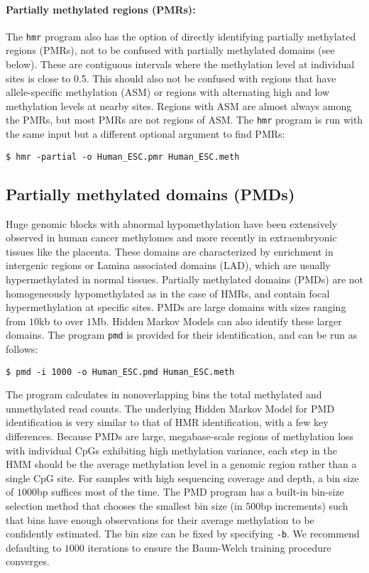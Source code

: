 \documentclass[10pt]{article}
\newcommand{\prog}[1]{\texttt{#1}}
\newcommand{\op}[1]{\texttt{#1}}
\begin{document}
\paragraph{Partially methylated regions (PMRs):}
The \prog{hmr} program also has the option of directly identifying
partially methylated regions (PMRs), not to be confused with partially
methylated domains (see below). These are contiguous intervals where
the methylation level at individual sites is close to 0.5. This should
also not be confused with regions that have allele-specific
methylation (ASM) or regions with alternating high and low methylation
levels at nearby sites. Regions with ASM are almost always among the
PMRs, but most PMRs are not regions of ASM. The \prog{hmr} program is
run with the same input but a different optional argument to find
PMRs:
\begin{verbatim}
$ hmr -partial -o Human_ESC.pmr Human_ESC.meth
\end{verbatim}


\subsection{Partially methylated domains (PMDs)}

Huge genomic blocks with abnormal hypomethylation have been
extensively observed in human cancer methylomes and more recently in
extraembryonic tissues like the placenta. These domains are
characterized by enrichment in intergenic regions or Lamina associated
domains (LAD), which are usually hypermethylated in normal
tissues. Partially methylated domains (PMDs) are not homogeneously
hypomethylated as in the case of HMRs, and contain focal
hypermethylation at specific sites. PMDs are large domains with sizes
ranging from $10$kb to over $1$Mb.  Hidden Markov Models can also
identify these larger domains. The program \prog{pmd} is provided for
their identification, and can be run as follows:

\begin{verbatim}
$ pmd -i 1000 -o Human_ESC.pmd Human_ESC.meth
\end{verbatim}

The program calculates in nonoverlapping bins the total methylated and
unmethylated read counts.
The underlying Hidden Markov Model for PMD identification is very
similar to that of HMR identification, with a few key differences. Because
PMDs are large, megabase-scale regions of methylation loss with
individual CpGs exhibiting high methylation variance, each step in
the HMM should be the average methylation level in a genomic region 
rather than a single CpG site. For samples with high sequencing coverage
and depth, a bin size of $1000$bp suffices most of the time. The PMD
program has a built-in bin-size selection method that chooses the smallest
bin size (in $500$bp increments) such that bins have enough observations
for their average methylation to be confidently estimated. The bin size
can be fixed by specifying \op{-b}. We recommend defaulting to $1000$
iterations to ensure the Baum-Welch training procedure converges.
\end{document}
